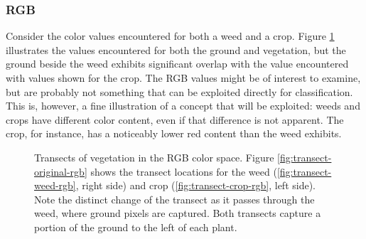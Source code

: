 \documentclass[letterpaper, notitlepage]{report}
\begin{document}
\subsubsection{RGB}
Consider the color values encountered for both a weed and a crop. Figure \ref{fig:transects-rgb} illustrates the values encountered for both the ground and vegetation, but the ground beside the weed exhibits significant overlap with the value encountered with values shown for the crop.  The RGB values might be of interest to examine, but are probably not something that can be exploited directly for classification. This is, however, a fine illustration of a concept that will be exploited: weeds and crops have different color content, even if that difference is not apparent.  The crop, for instance, has a noticeably lower red content than the weed exhibits.

\begin{figure}[h]
	\centering
	\hfill
	\hfill
	\caption[RGB Transects]{Transects of vegetation in the RGB color space. Figure \ref{fig:transect-original-rgb} shows the transect locations for the weed (\ref{fig:transect-weed-rgb}, right side) and crop (\ref{fig:transect-crop-rgb}, left side). Note the distinct change of the transect as it passes through the weed, where ground pixels are captured. Both transects capture a portion of the ground to the left of each plant.}
	\label{fig:transects-rgb}
\end{figure}
	
\end{document}

